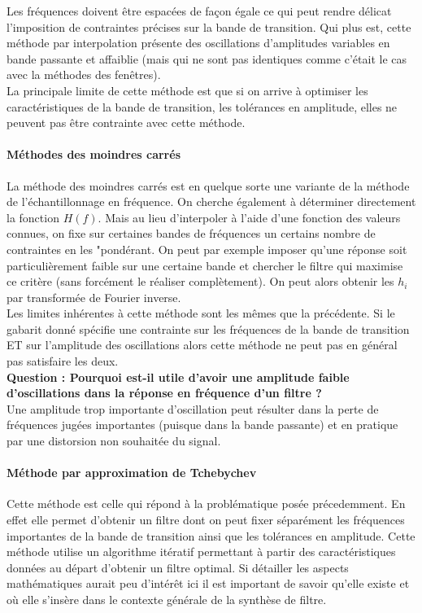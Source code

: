 \documentclass[11pt,a4paper]{article}
\begin{document}
Les fréquences doivent être espacées de façon égale ce qui peut rendre délicat l'imposition de contraintes précises sur la bande de transition. Qui plus est, cette méthode par interpolation présente des oscillations d'amplitudes variables en bande passante et affaiblie (mais qui ne sont pas identiques comme c'était le cas avec la méthodes des fenêtres).\\

La principale limite de cette méthode est que si on arrive à optimiser les caractéristiques de la bande de transition, les tolérances en amplitude, elles ne peuvent pas être contrainte avec cette méthode.\\

\paragraph{Méthodes des moindres carrés}
La méthode des moindres carrés est en quelque sorte une variante de la méthode de l'échantillonnage en fréquence. On cherche également à déterminer directement la fonction $H(f)$. Mais au lieu d'interpoler à l'aide d'une fonction des valeurs connues, on fixe sur certaines bandes de fréquences un certains nombre de contraintes en les "pondérant. On peut par exemple imposer qu'une réponse soit particulièrement faible sur une certaine bande et chercher le filtre qui maximise ce critère (sans forcément le réaliser complètement). On peut alors obtenir les $h_i$ par transformée de Fourier inverse.\\

Les limites inhérentes à cette méthode sont les mêmes que la précédente. Si le gabarit donné spécifie une contrainte sur les fréquences de la bande de transition ET sur l'amplitude des oscillations alors cette méthode ne peut pas en général pas satisfaire les deux.\\

\textbf{Question : Pourquoi est-il utile d'avoir une amplitude faible d'oscillations dans la réponse en fréquence d'un filtre ?}\\

Une amplitude trop importante d'oscillation peut résulter dans la perte de fréquences jugées importantes (puisque dans la bande passante) et en pratique par une distorsion non souhaitée du signal.\\

\paragraph{Méthode par approximation de Tchebychev}
Cette méthode est celle qui répond à la problématique posée précedemment. En effet elle permet d'obtenir un filtre dont on peut fixer séparément les fréquences importantes de la bande de transition ainsi que les tolérances en amplitude. Cette méthode utilise un algorithme itératif permettant à partir des caractéristiques données au départ d'obtenir un filtre optimal. Si détailler les aspects mathématiques aurait peu d'intérêt ici il est important de savoir qu'elle existe et où elle s'insère dans le contexte générale de la synthèse de filtre.\\
\end{document}
